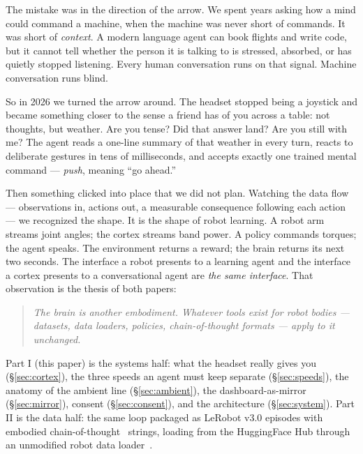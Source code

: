 \documentclass{article}
\begin{document}
The mistake was in the direction of the arrow. We spent years asking how a mind could command a machine, when the machine was never short of commands. It was short of \emph{context}. A modern language agent can book flights and write code, but it cannot tell whether the person it is talking to is stressed, absorbed, or has quietly stopped listening. Every human conversation runs on that signal. Machine conversation runs blind.

So in 2026 we turned the arrow around. The headset stopped being a joystick and became something closer to the sense a friend has of you across a table: not thoughts, but weather. Are you tense? Did that answer land? Are you still with me? The agent reads a one-line summary of that weather in every turn, reacts to deliberate gestures in tens of milliseconds, and accepts exactly one trained mental command --- \emph{push}, meaning ``go ahead.''

Then something clicked into place that we did not plan. Watching the data flow --- observations in, actions out, a measurable consequence following each action --- we recognized the shape. It is the shape of robot learning. A robot arm streams joint angles; the cortex streams band power. A policy commands torques; the agent speaks. The environment returns a reward; the brain returns its next two seconds. The interface a robot presents to a learning agent and the interface a cortex presents to a conversational agent are \emph{the same interface}. That observation is the thesis of both papers:

\begin{quote}
\emph{The brain is another embodiment. Whatever tools exist for robot bodies --- datasets, data loaders, policies, chain-of-thought formats --- apply to it unchanged.}
\end{quote}

Part I (this paper) is the systems half: what the headset really gives you (\S\ref{sec:cortex}), the three speeds an agent must keep separate (\S\ref{sec:speeds}), the anatomy of the ambient line (\S\ref{sec:ambient}), the dashboard-as-mirror (\S\ref{sec:mirror}), consent (\S\ref{sec:consent}), and the architecture (\S\ref{sec:system}). Part II is the data half: the same loop packaged as LeRobot v3.0 episodes with embodied chain-of-thought~\cite{zawalski2024ecot} strings, loading from the HuggingFace Hub through an unmodified robot data loader~\cite{cadene2024lerobot}.

\end{document}
